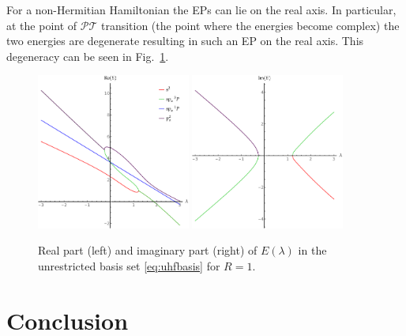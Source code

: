 \documentclass[11pt,a4paper]{article}
\newcommand{\pt}{$\mathcal{PT}$}
\begin{document}
For a non-Hermitian Hamiltonian the EPs can lie on the real axis. In particular, at the point of {\pt} transition (the point where the energies become complex) the two energies are degenerate resulting in such an EP on the real axis. This degeneracy can be seen in Fig.~\ref{fig:UHFPT}.

\begin{figure}[h!]
    \centering
    \includegraphics[width=0.45\textwidth]{ReNRJPT.pdf}
    \includegraphics[width=0.45\textwidth]{ImNRJPT.pdf}
    \caption{\centering Real part (left) and imaginary part (right) of $E(\lambda)$ in the unrestricted basis set \eqref{eq:uhfbasis} for $R=1$.}
    \label{fig:UHFPT}
\end{figure}

\section{Conclusion}
\end{document}

